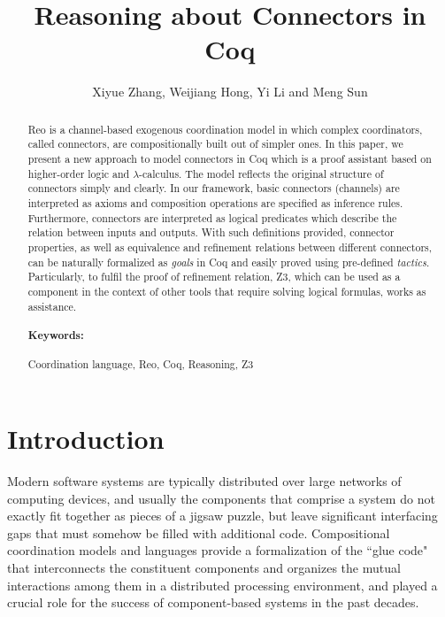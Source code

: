 \documentclass{llncs}
\begin{document}
\pagestyle{plain}
\mainmatter

\title{Reasoning about Connectors in Coq}


\author{Xiyue Zhang, Weijiang Hong, Yi Li and Meng Sun}



\maketitle
\begin{abstract}
Reo is a channel-based exogenous coordination model in which complex coordinators, called connectors, are compositionally
built out of simpler ones. In this paper, we present a new approach to model connectors in Coq which is a proof assistant based on higher-order logic and $\lambda$-calculus.
The model reflects the original structure of connectors simply and clearly. In our framework, basic connectors (channels) are interpreted as axioms and composition operations are specified as inference rules. Furthermore, connectors are interpreted as logical predicates which describe the relation
between inputs and outputs. With such definitions provided, connector properties, as well as equivalence and refinement relations between different connectors, can be naturally formalized as \emph{goals} in Coq and easily proved using pre-defined \emph{tactics}. Particularly, to fulfil the proof of refinement relation, Z3, which can be used as a component in the context of other tools that require solving logical formulas, works as assistance.
\paragraph*{Keywords:}
Coordination language, Reo, Coq, Reasoning, Z3
\end{abstract}

\section{Introduction}\label{sec:introduction}

Modern software systems are typically distributed over large networks of computing devices, and usually the components
that comprise a system do not exactly fit together as pieces of a jigsaw puzzle, but leave significant interfacing gaps
that must somehow be filled with additional code. Compositional coordination models and languages provide a formalization
of the ``glue code" that interconnects the constituent components and organizes the mutual interactions among them in a
distributed processing environment, and played a crucial role for the success of component-based systems in the past decades.
\end{document}
